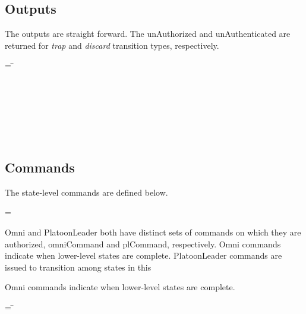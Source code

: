 \documentclass[../../main/main.tex]{subfiles}
\begin{document}
\subsection{Outputs}
The outputs are straight forward.  The unAuthorized and unAuthenticated are returned for \textit{trap} and \textit{discard} transition types, respectively.

\begin{tabbing}
 = \= \\
					\>\HOLTokenBar{}  \\
					\>\HOLTokenBar{}  \\
					\>\HOLTokenBar{} \\
         				\>\HOLTokenBar{}  \\
					\>\HOLTokenBar{}  \\
					\>\HOLTokenBar{} \\
         				\>\HOLTokenBar{} 
\end{tabbing}


\subsection{Commands}
The state-level commands are defined below.

 =   \HOLTokenBar{}  

Omni and PlatoonLeader both have distinct sets of commands on which they are authorized, omniCommand and plCommand, respectively.  Omni commands indicate when lower-level states are complete.  PlatoonLeader commands are issued to transition among states in this 

Omni commands indicate when lower-level states are complete.  

\begin{tabbing}
 = \= \\
						\>\HOLTokenBar{} \\
            					\>\HOLTokenBar{}  \\
						\>\HOLTokenBar{} \\
            					\>\HOLTokenBar{}  \\
						\>\HOLTokenBar{} 
\end{tabbing}
\end{document}

